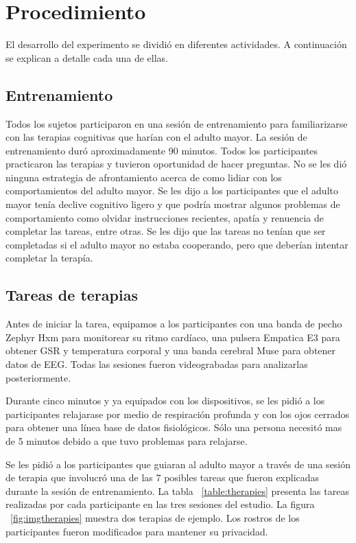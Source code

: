 \section{Procedimiento}\label{secc:methods}
El desarrollo del experimento se dividi\'o en diferentes actividades. A continuaci\'on se explican a detalle cada una de ellas.
\subsection{Entrenamiento}\label{secc:training}
	Todos los sujetos participaron en una sesi\'on de entrenamiento para familiarizarse con las terapias cognitivas que har\'ian con el adulto mayor. La sesi\'on de entrenamiento dur\'o aproximadamente 90 minutos. Todos los participantes practicaron las terapias y tuvieron oportunidad de hacer preguntas. No se les di\'o ninguna estrategia de afrontamiento acerca de como lidiar con los comportamientos del adulto mayor. Se les dijo a los participantes que el adulto mayor ten\'ia declive cognitivo ligero y que podr\'ia mostrar algunos problemas de comportamiento como olvidar instrucciones recientes, apat\'ia y renuencia de completar las tareas, entre otras. Se les dijo que las tareas no ten\'ian que ser completadas si el adulto mayor no estaba cooperando, pero que deber\'ian intentar completar la terap\'ia.

\subsection{Tareas de terapias}\label{secc:therapytasks}
Antes de iniciar la tarea, equipamos a los participantes con una banda de pecho Zephyr Hxm para monitorear su ritmo card\'iaco, una pulsera Empatica E3 para obtener GSR y temperatura corporal y una banda cerebral Muse para obtener datos de EEG. Todas las sesiones fueron videograbadas para analizarlas posteriormente.

Durante cinco minutos y ya equipados con los dispositivos, se les pidi\'o a los participantes relajarase por medio de respiraci\'on profunda y con los ojos cerrados para obtener una l\'inea base de datos fisiol\'ogicos. S\'olo una persona necesit\'o mas de 5 minutos debido a que tuvo problemas para relajarse.

Se les pidi\'o a los participantes que guiaran al adulto mayor a trav\'es de una sesi\'on de terapia que involucr\'o una de las 7 posibles tareas que fueron explicadas durante la sesi\'on de entrenamiento. La tabla ~\ref{table:therapies} presenta las tareas realizadas por cada participante en las tres sesiones del estudio. La figura ~\ref{fig:imgtherapies} muestra dos terapias de ejemplo. Los rostros de los participantes fueron modificados para mantener su privacidad.

